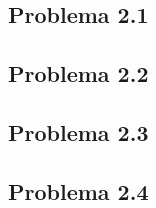 \subsection{Problema 2.1}

\newpage

\subsection{Problema 2.2}

\newpage

\subsection{Problema 2.3}

\newpage

\subsection{Problema 2.4}
